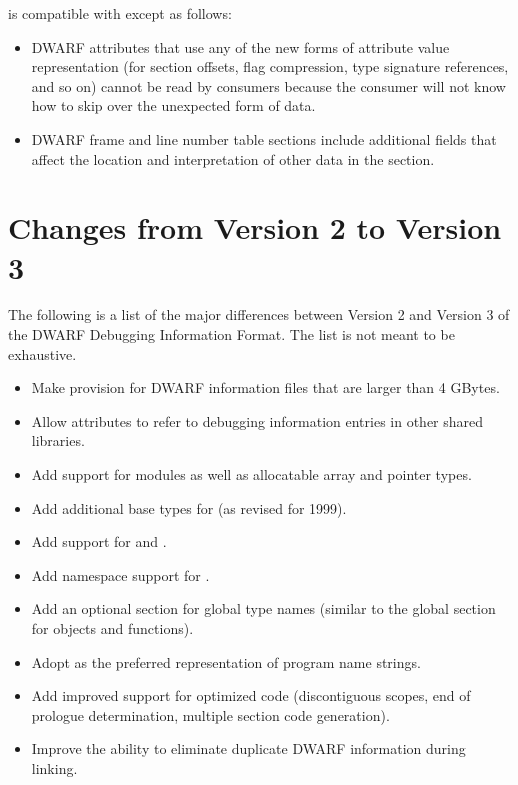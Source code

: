  is compatible with 
 except as follows:
\begin{itemize}
\item DWARF attributes that use any of the new forms of attribute value representation (for
section offsets, flag compression, type signature references, and so on) cannot be read by
consumers because the consumer will not know how to skip over the
unexpected form of data.
\item DWARF frame and line number table sections include additional fields that affect the location
and interpretation of other data in the section.
\end{itemize}

\section{Changes from Version 2 to Version 3}
The following is a list of the major differences between
Version 2 and Version 3 of the DWARF Debugging Information
Format. The list is not meant to be exhaustive.
\begin{itemize}
\item
Make provision for DWARF information files that are larger
than 4 GBytes.
\item
Allow attributes to refer to debugging information entries
in other shared libraries.
\item
Add support for  modules as well as allocatable
array and pointer types.
\item
Add additional base types for  (as revised for 1999).
\item
Add support for  and .
\item
Add namespace support for .
\item
Add an optional section for global type names (similar to
the global section for objects and functions).
\item
Adopt  as the preferred representation of program name strings.
\item
Add improved support for optimized code (discontiguous
scopes, end of prologue determination, multiple section
code generation).  
\item Improve the ability to eliminate
duplicate DWARF information during linking.  
\end{itemize}

